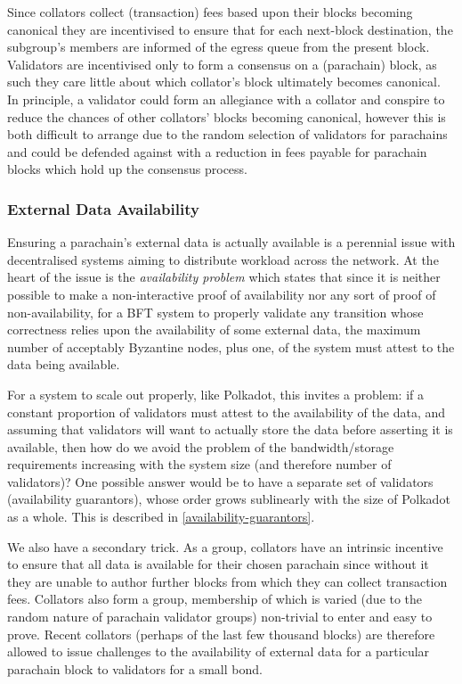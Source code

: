 \documentclass[9pt,oneside]{amsart}
\begin{document}
\begin{multicols}{2}
 Since collators collect (transaction) fees based upon their blocks becoming canonical they are incentivised to ensure that for each next-block destination, the subgroup's members are informed of the egress queue from the present block. Validators are incentivised only to form a consensus on a (parachain) block, as such they care little about which collator's block ultimately becomes canonical. In principle, a validator could form an allegiance with a collator and conspire to reduce the chances of other collators' blocks becoming canonical, however this is both difficult to arrange due to the random selection of validators for parachains and could be defended against with a reduction in fees payable for parachain blocks which hold up the consensus process.

\subsubsection{External Data Availability}

 Ensuring a parachain's external data is actually available is a perennial issue with decentralised systems aiming to distribute workload across the network. At the heart of the issue is the \textit{availability problem} which states that since it is neither possible to make a non-interactive proof of availability nor any sort of proof of non-availability, for a BFT system to properly validate any transition whose correctness relies upon the availability of some external data, the maximum number of acceptably Byzantine nodes, plus one, of the system must attest to the data being available.

 For a system to scale out properly, like Polkadot, this invites a problem: if a constant proportion of validators must attest to the availability of the data, and assuming that validators will want to actually store the data before asserting it is available, then how do we avoid the problem of the bandwidth/storage requirements increasing with the system size (and therefore number of validators)? One possible answer would be to have a separate set of validators (availability guarantors), whose order grows sublinearly with the size of Polkadot as a whole. This is described in \ref{availability-guarantors}.

 We also have a secondary trick. As a group, collators have an intrinsic incentive to ensure that all data is available for their chosen parachain since without it they are unable to author further blocks from which they can collect transaction fees. Collators also form a group, membership of which is varied (due to the random nature of parachain validator groups) non-trivial to enter and easy to prove. Recent collators (perhaps of the last few thousand blocks) are therefore allowed to issue challenges to the availability of external data for a particular parachain block to validators for a small bond.


\end{multicols}
\end{document}
